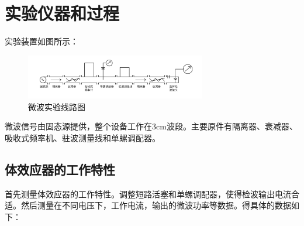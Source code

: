 \documentclass[aps,pre,12pt,preprint,onecolumn,showpacs,showkeys,UTF8]{revtex4-1}
\begin{document}
\section{实验仪器和过程}
实验装置如图所示：
\begin{figure}[h]
	\begin{center}
		\includegraphics[width=0.7\textwidth]{pic1.png}
		\caption{\label{g:1}微波实验线路图}
	\end{center}
\end{figure}

微波信号由固态源提供，整个设备工作在3cm波段。主要原件有隔离器、衰减器、吸收式频率机、驻波测量线和单螺调配器。

\subsection{体效应器的工作特性}

首先测量体效应器的工作特性。调整短路活塞和单螺调配器，使得检波输出电流合适。然后测量在不同电压下，工作电流，输出的微波功率等数据。得具体的数据如下：
\end{document}
